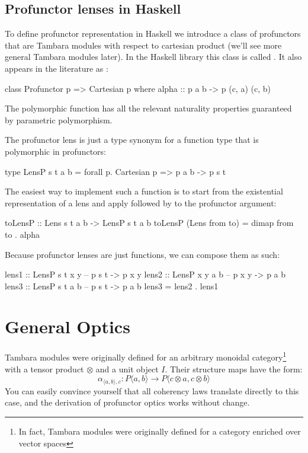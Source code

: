 \documentclass[DaoFP]{subfiles}
\begin{document}
\subsection{Profunctor lenses in Haskell}

To define profunctor representation in Haskell we introduce a class of profunctors that are Tambara modules with respect to cartesian product (we'll see more general Tambara modules later). In the Haskell library this class is called . It also appears in the literature as :
\begin{haskell}
class Profunctor p => Cartesian p where
  alpha :: p a b -> p (c, a) (c, b)
\end{haskell}
The polymorphic function  has all the relevant naturality properties guaranteed by parametric polymorphism. 

The profunctor lens is just a type synonym for a function type that is polymorphic in  profunctors:
\begin{haskell}
type LensP s t a b = forall p. Cartesian p => p a b -> p s t
\end{haskell}

The easiest way to implement such a function is to start from the existential representation of a lens and apply  followed by  to the profunctor argument:
\begin{haskell}
toLensP :: Lens s t a b -> LensP s t a b
toLensP (Lens from to) = dimap from to . alpha
\end{haskell}

Because profunctor lenses are just functions, we can compose them as such:
\begin{haskell}
lens1 :: LensP s t x y 
-- p s t -> p x y
lens2 :: LensP x y a b 
-- p x y -> p a b
lens3 :: LensP s t a b 
-- p s t -> p a b
lens3 = lens2 . lens1
\end{haskell}

\section{General Optics}
Tambara modules were originally defined for an arbitrary monoidal category\footnote{In fact, Tambara modules were originally defined for a category enriched over vector spaces} with a tensor product $\otimes$ and a unit object $I$. Their structure maps have the form:
\[ \alpha_{\langle a, b\rangle, c} \colon P \langle a, b \rangle \to P \langle c \otimes a, c \otimes b \rangle \]
You can easily convince yourself that all coherency laws translate directly to this case, and the derivation of profunctor optics works without change.
\end{document}
